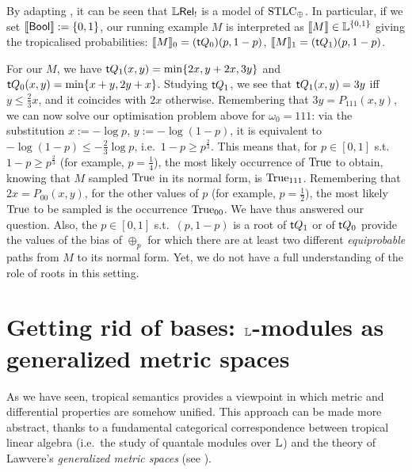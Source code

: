 \documentclass[submission,%
]{eptcs}
\begin{document}
\begin{remark}
 By adapting \cite[Section IV]{Manzo2013}, it can be seen that $\mathbb{L} \mathsf{Rel}_!$ is a model of $\mathrm{STLC}_\oplus$.
 In particular, if we set $\llbracket\mathsf{Bool}\rrbracket:=\{0,1\}$, our running example $M$ is interpreted as $\llbracket M\rrbracket\in\mathbb{L}^{\{0,1\}}$ giving the tropicalised probabilities: $\llbracket M\rrbracket_0=(\mathsf{t} Q_0)(p,1-p)$, $\llbracket M\rrbracket_1=(\mathsf{t} Q_1)(p,1-p)$.
\end{remark}


For our $M$, we have $\mathsf{t} Q_1(x,y)=\min\{2x,y+2x,3y\}$ and $\mathsf{t} Q_0(x,y)=\min\{x+y,2y+x\}$.
Studying $\mathsf{t} Q_1$, we see that $\mathsf{t} Q_1(x,y)=3y$ iff $y\leq \frac{2}{3}x$, and it coincides with $2x$ otherwise.
Remembering that $3y=P_{111}(x,y)$, we can now solve our optimisation problem above for $\omega_0=111$:
via the substitution $x:=-\log p$, $y:=-\log (1-p)$, it is equivalent to $-\log (1-p)\leq -\frac{2}{3}\log p$, i.e.\ $1-p\geq p^{\frac{2}{3}}$.
This means that, for $p\in[0,1]$ s.t.\ $1-p\geq p^{\frac{2}{3}}$ (for example, $p=\frac{1}{4}$), the most likely occurrence of $\mathrm{True}$ to obtain, knowing that $M$ sampled $\mathrm{True}$ in its normal form, is $\mathrm{True}_{111}$.
Remembering that $2x=P_{00}(x,y)$, for the other values of $p$ (for example, $p=\frac{1}{2}$), the most likely $\mathrm{True}$ to be sampled is the occurrence $\mathrm{True}_{00}$.
We have thus answered our question.
Also, the $p\in[0,1]$ s.t.\ $(p,1-p)$ is a root of $\mathsf{t} Q_1$ or of $\mathsf{t} Q_0$ provide the values of the bias of $\oplus_p$ for which there are at least two different \emph{equiprobable} paths from $M$ to its normal form.
Yet, we do not have a full understanding of the role of roots in this setting.


\section{Getting rid of bases: $\mathbb{L}$-modules as generalized metric spaces}

As we have seen, tropical semantics provides a viewpoint in which metric and differential properties are somehow unified.
This approach can be made more abstract, thanks to a fundamental categorical correspondence between tropical linear algebra (i.e.~the study of quantale modules over $\mathbb{L}$) and the theory of Lawvere's \emph{generalized metric spaces} (see \cite{Fuji, Stubbe2006}).
\end{document}
